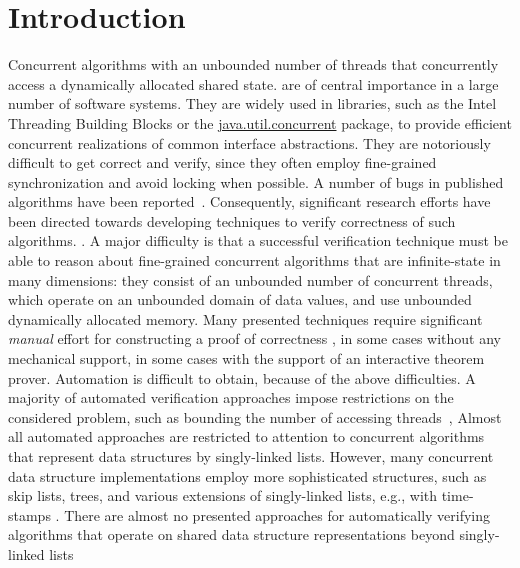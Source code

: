 \section{Introduction}



Concurrent algorithms with an unbounded number of
threads that concurrently access a dynamically allocated shared state.
are of central importance in a large number of software systems.
They are widely used in libraries,
such as the Intel Threading Building Blocks or
the \url{java.util.concurrent} package,
to provide efficient concurrent realizations of
common interface abstractions.
They are notoriously difficult to get correct and verify, since they
often employ fine-grained synchronization and avoid locking when
possible. A number of bugs  in published
algorithms have been reported~\cite{DDGJLMMSS:dcas,MiSc:correction}.
Consequently, significant research efforts have been directed towards developing
techniques to verify correctness of such algorithms.
.
A major difficulty is that a successful verification technique must be
able to reason about fine-grained concurrent algorithms that are infinite-state
in many dimensions: 
they consist of an unbounded number of concurrent threads, which
operate on an unbounded domain of data values, and use
unbounded dynamically allocated memory. 
Many presented techniques require significant {\em manual} effort for
constructing a proof of
correctness , in some cases without any mechanical support,
in some cases with the support of an interactive theorem prover.
Automation is difficult to obtain, because of the above difficulties.
A majority of automated verification approaches impose restrictions on
the considered problem, such as bounding the number of accessing
threads~\cite{Amit:comparisonAbstraction,Vechev:spin09,CernyRZCA:CAV10},
Almost all automated approaches are restricted to attention to concurrent algorithms
that represent data structures by singly-linked lists. However, many concurrent
data structure implementations employ more sophisticated structures, such as
skip lists, trees, and various extensions of singly-linked lists, e.g., with
time-stamps .
There are almost no presented approaches for automatically verifying algorithms
that operate on shared data structure representations beyond singly-linked
lists 

